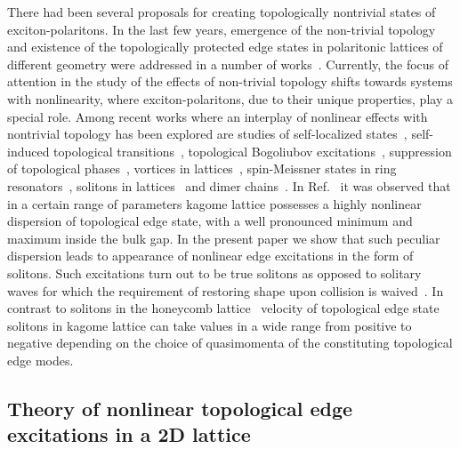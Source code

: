 \documentclass[
aps,
prl,
groupedaddress,
superscriptaddress,
floatfix,
notitlepage
]{revtex4-1}
\begin{document}
There had been several proposals for creating topologically nontrivial states of exciton-polaritons. In the last few years, emergence of the non-trivial topology and existence of the topologically protected edge states in polaritonic lattices of different geometry were addressed in a number of works~\cite{Karzig-PRX-2015, Bardyn-PRB-2015, Nalitov-Z, Yi-PRB-2016, Bardyn-PRB-2016, Janot-PRB-2016, Gulevich-kagome}.
Currently, the focus of attention in the study of the effects of non-trivial topology shifts towards systems with nonlinearity, where exciton-polaritons, due to their unique properties, play a special role. Among recent works where an interplay of nonlinear effects with nontrivial topology has been explored are studies of self-localized states~\cite{Lumer-PRL-2013, Ostrovskaya2013}, self-induced topological transitions~\cite{Hadad-PRB-2016}, topological Bogoliubov excitations~\cite{Bardyn-PRB-2016}, 
suppression of topological phases~\cite{Bleu-PRB-2016}, vortices in lattices~\cite{Kartashov-OL-2016}, spin-Meissner states in ring resonators~\cite{DGulevich-Meissner}, solitons in lattices~\cite{Ablowitz-PRA-2014, Leykam-PRL-2016, Kartashov-Optica-2016, CedraMendez2016} and dimer 
chains~\cite{Soln-PRL-2017}. 
In Ref.~\cite{Gulevich-kagome} it was observed that in a certain range of parameters kagome lattice possesses a highly nonlinear dispersion of topological edge state, with a well pronounced minimum and maximum inside the bulk gap. In the present paper we show that such peculiar dispersion leads to appearance of nonlinear edge excitations in the form of solitons. Such excitations turn out to be true solitons as opposed to solitary waves for which the requirement of restoring shape upon collision is waived~\cite{Rajaraman}. In contrast to solitons in the honeycomb lattice~\cite{Kartashov-Optica-2016} 
velocity of topological edge state solitons in kagome lattice can take values in a wide range from positive to negative 
depending on the choice of quasimomenta of the constituting topological edge modes.

\subsection*{Theory of nonlinear topological edge excitations in a 2D lattice}
\end{document}

